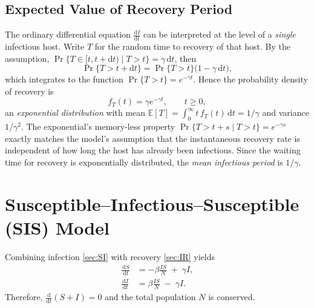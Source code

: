 \documentclass[11pt]{article}
\newcommand{\dd}{\,\mathrm{d}}
\begin{document}
\subsection*{Expected Value of Recovery Period}
The ordinary differential equation \(\frac{\mathrm{d}I}{\mathrm{d}t}\) can be interpreted
at the level of a \emph{single} infectious host.  Write \(T\) for the random time
to recovery of that host. By the assumption, \(\Pr\{T\in[t,t+\mathrm dt)\mid T>t\}=\gamma\,\mathrm dt\), then
\begin{equation*}
\Pr\{T>t+\mathrm dt\}
  =\Pr\{T>t\}\bigl(1-\gamma\,\mathrm dt\bigr),
\end{equation*}
which integrates to the function
\(\Pr\{T>t\}=e^{-\gamma t}\).  Hence the probability density of recovery is
\begin{equation*}
f_{T}(t)=\gamma e^{-\gamma t},\qquad t\ge 0,
\end{equation*}
an \emph{exponential distribution} with mean
\(\mathbb E[T]=\int_{0}^{\infty} t\,f_{T}(t)\,\mathrm dt=1/\gamma\) and variance
\(1/\gamma^{2}\).  The exponential’s memory-less property
\(\Pr\{T>t+s\mid T>t\}=e^{-\gamma s}\) exactly matches the model’s assumption
that the instantaneous recovery rate is independent of how long the host has
already been infectious. 
Since the waiting time for recovery is exponentially distributed, the \emph{mean infectious period} is $1/\gamma$.

\section{Susceptible–Infectious–Susceptible (SIS) Model}\label{sec:SIS}

Combining infection \cref{sec:SI} with
recovery \cref{sec:IR} yields
\begin{align*}
  \frac{\dd S}{\dd t} &= -\beta \frac{I S}{N} \;+\; \gamma I, \\
  \frac{\dd I}{\dd t} &=  \beta \frac{I S}{N} \;-\; \gamma I.
\end{align*}
Therefore, \(
\frac{\mathrm d}{\mathrm dt}(S+I)=0
\)
and the total population \(N\) is conserved.

\end{document}
